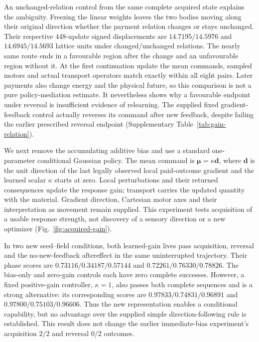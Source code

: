 An unchanged-relation control from the same complete acquired state explains the ambiguity. Freezing the linear weights leaves the two bodies moving along their original direction whether the payment relation changes or stays unchanged. Their respective 448-update signed displacements are $14.7195/14.5976$ and $14.6945/14.5693$ lattice units under changed/unchanged relations. The nearly same route ends in a favourable region after the change and an unfavourable region without it. At the first continuation update the mean commands, sampled motors and actual transport operators match exactly within all eight pairs. Later payments also change energy and the physical future, so this comparison is not a pure policy-mediation estimate. It nevertheless shows why a favourable endpoint under reversal is insufficient evidence of relearning. The supplied fixed gradient-feedback control actually reverses its command after new feedback, despite failing the earlier prescribed reversal endpoint (Supplementary Table~\ref{tab:gain-relation}).

We next remove the accumulating additive bias and use a standard one-parameter conditional Gaussian policy. The mean command is $\boldsymbol\mu=\kappa\boldsymbol d$, where $\boldsymbol d$ is the unit direction of the last legally observed local paid-outcome gradient and the learned scalar $\kappa$ starts at zero. Local perturbations and their returned consequences update the response gain; transport carries the updated quantity with the material. Gradient direction, Cartesian motor axes and their interpretation as movement remain supplied. This experiment tests acquisition of a usable response strength, not discovery of a sensory direction or a new optimizer (Fig.~\ref{fig:acquired-gain}).

In two new seed--field conditions, both learned-gain lives pass acquisition, reversal and the no-new-feedback aftereffect in the same uninterrupted trajectory. Their phase scores are $0.73116/0.34187/0.57144$ and $0.72261/0.76330/0.78826$. The bias-only and zero-gain controls each have zero complete successes. However, a fixed positive-gain controller, $\kappa=1$, also passes both complete sequences and is a strong alternative: its corresponding scores are $0.97833/0.74831/0.96891$ and $0.97800/0.75103/0.96606$. Thus the new representation enables a conditional capability, but no advantage over the supplied simple direction-following rule is established. This result does not change the earlier immediate-bias experiment's acquisition $2/2$ and reversal $0/2$ outcomes.

